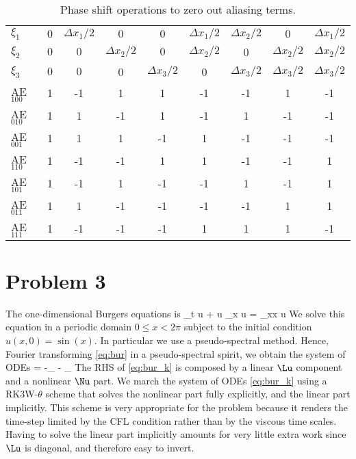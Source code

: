 \documentclass[11pt]{article}
\def\hatgap{2pt}
\def\subdown{-2pt}
\newcommand\what[2][]{%
\renewcommand\stackalignment{l}%
\stackon[\hatgap]{#2}{%
\stretchto{%
    \scalerel*[\widthof{$#2$}]{\kern-.6pt\bigwedge\kern-.6pt}%
    {\rule[-\textheight/2]{1ex}{\textheight}}%
}{0.5ex}%
_{\smash{\belowbaseline[\subdown]{\scriptstyle#1}}}%
}}
\begin{document}
\begin{table}
\label{tab:phase_shift_error_3d}
\caption{Phase shift operations to zero out aliasing terms.}
\centering
\begin{tabular}{l| c | c | c  | c | c | c | c | c}
    $\xi_1$  & $0$ & $\Delta x_1/2$ & $0$ & $0$ &  $\Delta x_1/2$ & $\Delta x_2/2$ & $0$ & $\Delta x_1/2$\\ 
    $\xi_2$  & $0$ & $0$ & $\Delta x_2/2$ & $0$ &  $\Delta x_2/2$ & 0              & $\Delta x_2/2$ & $\Delta x_2/2$ \\ 
    $\xi_3$  & $0$ & $0$ & 0 & $\Delta x_3/2$   &  0 &$\Delta x_3/2$               & $\Delta x_3/2$ & $\Delta x_3/2$\\ 
    \hline
    AE$_{100}$ & 1 & -1 & 1 & 1 & -1 &  -1&  1 &  -1    \\
    AE$_{010}$ & 1 & 1 & -1 & 1 & -1 &   1&  -1 &  -1    \\
    AE$_{001}$ & 1 & 1 & 1 & -1 & 1 &   -1&  -1 &  -1    \\
    AE$_{110}$ & 1 & -1 & -1 & 1& 1 &   -1&   -1 &   1    \\
    AE$_{101}$ & 1 & -1 & 1 & -1 &-1 &   1&   -1 &   1    \\
    AE$_{011}$ & 1 & 1 & -1 & -1 & -1&  -1&   1 &   1    \\
    AE$_{111}$ & 1 & -1 & -1 & -1 &1&    1&  1 &  -1    \\
\end{tabular}
\end{table}

\section*{Problem 3}
The one-dimensional Burgers equations is
\beq
\label{eq:bur}
\p_t u + u \p_x u = \nu \p_{xx} u\per
\eeq
We solve this equation in a periodic domain $0\leq x < 2\pi$ subject to the initial condition $u(x,0) = \sin(x)$. In particular we use a pseudo-spectral method. Hence, Fourier transforming \eqref{eq:bur} in a pseudo-spectral spirit, we obtain the system of ODEs
\beq
\label{eq:bur_k}
\frac{\dd \what{u}_k}{\dd t} = -\underbrace{ \what{(u\p_x u)}_k}_{\Nu} - \underbrace{\nu k^2 \what{u}_k}_{\Lu}\per
\eeq
The RHS of \eqref{eq:bur_k} is composed by a linear $\Lu$ component and a nonlinear $\Nu$ part. We march the system of ODEs  \eqref{eq:bur_k} using a RK3W-$\theta$ scheme that solves the nonlinear part fully explicitly, and the linear part implicitly. This scheme is very appropriate for the problem  because it renders the time-step limited by the CFL condition rather than by the viscous time scales. Having to solve the linear part implicitly amounts for very little extra work since $\Lu$ is diagonal, and therefore easy to invert.
\end{document}
